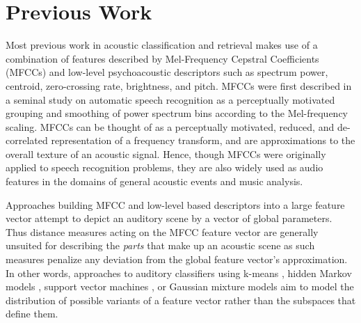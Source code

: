 \section{Previous Work}

Most previous work in acoustic classification and retrieval makes use of a combination of features described by Mel-Frequency Cepstral Coefficients (MFCCs) and low-level psychoacoustic descriptors \cite{Temko2007,Guo2003a,McKinney2003,Allamanche2001} such as spectrum power, centroid, zero-crossing rate, brightness, and pitch.  MFCCs were first described in a seminal study on automatic speech recognition \cite{Davis1980} as a perceptually motivated grouping and smoothing of power spectrum bins according to the Mel-frequency scaling.  MFCCs can be thought of as a perceptually motivated, reduced, and de-correlated representation of a frequency transform, and are approximations to the overall texture of an acoustic signal.  Hence, though MFCCs were originally applied to speech recognition problems, they are also widely used as audio features in the domains of general acoustic events \cite{Temko2007} and music \cite{Pampalk2006a,McKinney2003} analysis.  





Approaches building MFCC and low-level based descriptors into a large feature vector attempt to depict an auditory scene by a vector of global parameters. Thus distance measures acting on the MFCC feature vector are generally unsuited for describing the \textit{parts} that make up an acoustic scene as such measures penalize any deviation from the global feature vector's approximation.  In other words, approaches to auditory classifiers using k-means \cite{Harma2005,Eronen2006,Allamanche2001}, hidden Markov models \cite{Eronen2006,Mesaros2010}, support vector machines \cite{Guo2003a}, or Gaussian mixture models \cite{Wang2011,Aucouturier2007a,Pampalk2006a} aim to model the distribution of possible variants of a feature vector rather than the subspaces that define them.  

